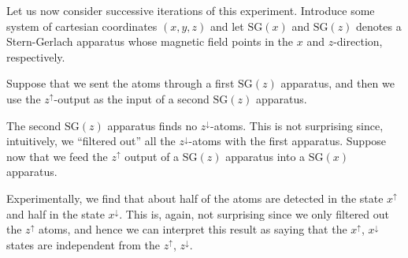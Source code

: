 \begin{enumerate}[label=(\alph*)]
Let us now consider successive iterations of this experiment.
Introduce some system of cartesian coordinates $(x,y,z)$ and let
$\mathrm{SG}(x)$ and $\mathrm{SG}(z)$ denotes a Stern-Gerlach
apparatus whose magnetic field points in the $x$ and $z$-direction,
respectively.

Suppose that we sent the atoms through a first $\mathrm{SG}(z)$
apparatus, and then we use the $z^\uparrow$-output as the input of a
second $\mathrm{SG}(z)$ apparatus.
\begin{center}
\end{center}
The second $\mathrm{SG}(z)$ apparatus finds no $z^\downarrow$-atoms. This is not surprising since, intuitively, we ``filtered out'' all the $z^\downarrow$-atoms with the first apparatus. Suppose now that we feed the $z^\uparrow$ output of a $\mathrm{SG}(z)$ apparatus into a $\mathrm{SG}(x)$ apparatus.

\begin{center}
\end{center}
Experimentally, we find that about half of the atoms are detected in the state $x^\uparrow$ and half in the state $x^\downarrow$. This is, again, not surprising since we only filtered out the $z^\uparrow$ atoms, and hence we can interpret this result as saying that the $x^\uparrow$, $x^\downarrow$ states are independent from the $z^\uparrow$, $z^\downarrow$.


\end{enumerate}
